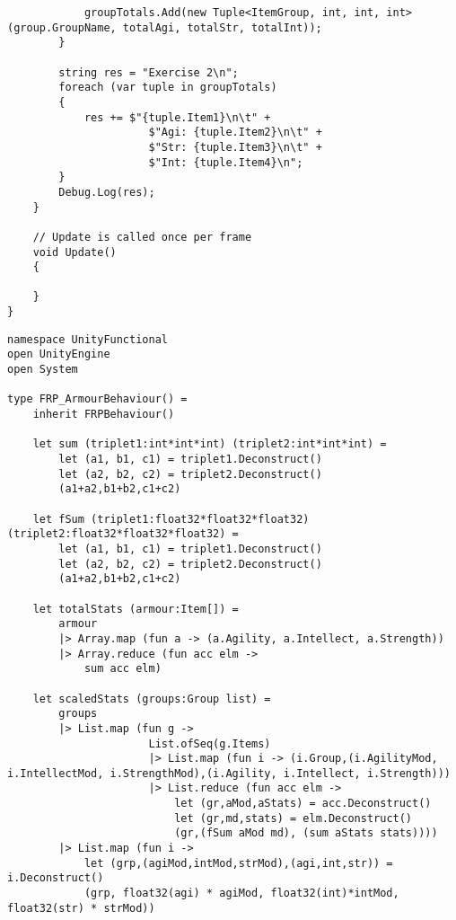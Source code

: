 \begin{listing}[H]
\begin{verbatim}
            groupTotals.Add(new Tuple<ItemGroup, int, int, int>(group.GroupName, totalAgi, totalStr, totalInt));
        }

        string res = "Exercise 2\n";
        foreach (var tuple in groupTotals)
        {
            res += $"{tuple.Item1}\n\t" +
                      $"Agi: {tuple.Item2}\n\t" +
                      $"Str: {tuple.Item3}\n\t" +
                      $"Int: {tuple.Item4}\n";
        }
        Debug.Log(res);
    }

    // Update is called once per frame
    void Update()
    {

    }
}

\end{verbatim}
\end{listing}

\begin{listing}[H]
\begin{verbatim}
namespace UnityFunctional
open UnityEngine
open System

type FRP_ArmourBehaviour() =
    inherit FRPBehaviour()

    let sum (triplet1:int*int*int) (triplet2:int*int*int) =
        let (a1, b1, c1) = triplet1.Deconstruct()
        let (a2, b2, c2) = triplet2.Deconstruct()
        (a1+a2,b1+b2,c1+c2)

    let fSum (triplet1:float32*float32*float32) (triplet2:float32*float32*float32) =
        let (a1, b1, c1) = triplet1.Deconstruct()
        let (a2, b2, c2) = triplet2.Deconstruct()
        (a1+a2,b1+b2,c1+c2)

    let totalStats (armour:Item[]) =
        armour
        |> Array.map (fun a -> (a.Agility, a.Intellect, a.Strength))
        |> Array.reduce (fun acc elm ->
            sum acc elm)

    let scaledStats (groups:Group list) =
        groups
        |> List.map (fun g ->
                      List.ofSeq(g.Items)
                      |> List.map (fun i -> (i.Group,(i.AgilityMod, i.IntellectMod, i.StrengthMod),(i.Agility, i.Intellect, i.Strength)))
                      |> List.reduce (fun acc elm ->
                          let (gr,aMod,aStats) = acc.Deconstruct()
                          let (gr,md,stats) = elm.Deconstruct()
                          (gr,(fSum aMod md), (sum aStats stats))))
        |> List.map (fun i ->
            let (grp,(agiMod,intMod,strMod),(agi,int,str)) = i.Deconstruct()
            (grp, float32(agi) * agiMod, float32(int)*intMod, float32(str) * strMod))


\end{verbatim}
\end{listing}
